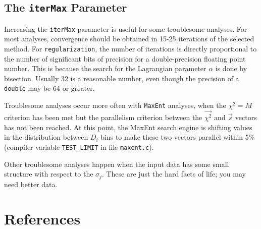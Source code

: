 \documentclass[letterpaper]{article}
\begin{document}
\subsection{The \texttt{iterMax} Parameter}

Increasing the \texttt{iterMax} parameter is useful for 
some troublesome analyses.  For most analyses, convergence 
should be obtained in 15-25 iterations of the selected 
method.  For \texttt{regularization}, the number of 
iterations is directly proportional to the number of 
significant bits of precision for a double-precision 
floating point number.  This is because the search for the 
Lagrangian parameter $\alpha$ is done by bisection.  
Usually 32 is a reasonable number, even though the 
precision of a \texttt{double} may be 64 or greater.

Troublesome analyses occur more often with \texttt{MaxEnt} 
analyses, when the $\chi^2=M$ criterion has been met but 
the parallelism criterion between the $\vec{\chi^2}$ and $\vec s$ 
vectors has not been reached.  At this point, the MaxEnt 
search engine
is shifting values in the distribution between $D_i$ bins 
to make these two vectors parallel within 5\% (compiler 
variable \verb|TEST_LIMIT| in file \texttt{maxent.c}).

Other troublesome analyses happen when the input data has 
some small structure with respect to the $\sigma_j$.  
These are just the hard facts of life; you may need better data.



\section{References}
\end{document}
